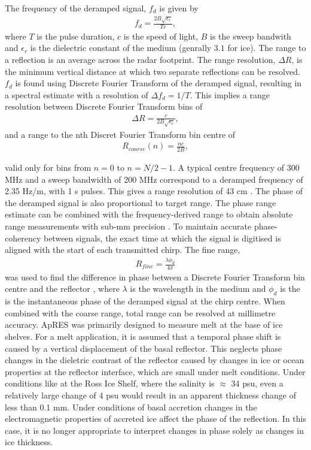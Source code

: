 The frequency of the deramped signal, $f_d$ is given by
\begin{align}
    f_d = \frac{2 B \sqrt{\epsilon_r}}{Tc},
\end{align}
where $T$ is the pulse duration, $c$ is the speed of light, $B$ is the sweep bandwith and $\epsilon_r$ is the dielectric constant of the medium (genrally $3.1$ for ice).
The range to a reflection is an average across the radar footprint. The range resolution, $\Delta R$, is the minimum vertical distance at which two separate reflections can be resolved.
$f_d$ is found using Discrete Fourier Transform of the deramped signal, resulting in a spectral estimate with a resolution of $\Delta f_d = 1 /T$. This implies a range resolution between Discrete Fourier Transform bins of
\begin{align}
    \Delta R = \frac{c}{2B \sqrt{\epsilon_r} },
\end{align}
and a range to the nth Discret Fourier Transform bin centre of
\begin{align}
    R_{coarse}(n) = \frac{n c}{2B},
\end{align}

valid only for bins from $n = 0$ to $n= N/2 -1$.%
A typical centre frequency of 300 MHz and a sweep bandwidth of 200 MHz correspond to a deramped frequency of 2.35 Hz/m, with 1 s pulses. This gives a range resolution of 43 cm \cite{brennan2014phase}.
The phase of the deramped signal is also proportional to target range. The phase range estimate can be combined with the frequency-derived range to obtain absolute range measurements with sub-mm precision \cite{brennan2014phase}. To maintain accurate phase-coherency between signals, the exact time at which the signal is digitised is aligned with the start of each transmitted chirp. The fine range,
\begin{align}
    R_{fine} = \frac{\lambda \phi_d}{4 \pi}
\end{align}
was used to find the difference in phase between a Discrete Fourier Transform bin centre and the reflector \cite{brennan2014phase}, where $\lambda$ is the wavelength in the medium and $\phi_d$ is the is the instantaneous phase of the deramped signal at the chirp centre.
When combined with the coarse range, total range can be resolved at millimetre accuracy. 
ApRES was primarily designed to measure melt at the base of ice shelves. For a melt application, it is assumed that a temporal phase shift is caused by a vertical displacement of the basal reflector. This neglects phase changes in the dieletric contrast of the reflector caused by changes in ice or ocean properties at the reflector interface, which are small under melt conditions. Under  conditions like at the Ross Ice Shelf, where the salinity is $\approx$ 34 psu, even a relatively large change of 4 psu would result in an apparent thickness change of less than 0.1 mm.
Under conditions of basal accretion changes in the electromagnetic properties of accreted ice affect the phase of the reflection. In this case, it is no longer appropriate to interpret changes in phase solely as changes in ice thickness.


